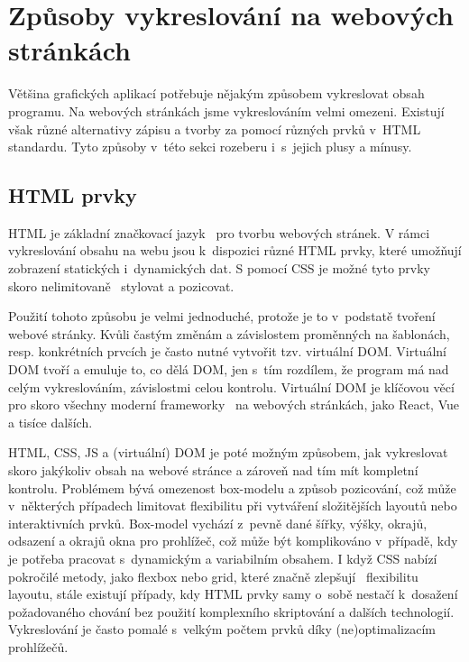 \section{Způsoby vykreslování na webových stránkách}\label{text:vykreslovani}

Většina grafických aplikací potřebuje nějakým způsobem vykreslovat obsah programu.
Na webových stránkách jsme vykreslováním velmi omezeni.
Existují však různé alternativy zápisu a tvorby za pomocí různých prvků v~HTML standardu.
Tyto způsoby v~této sekci rozeberu i~s~jejich plusy a mínusy.

\subsection{HTML prvky}\label{text:vykreslovani/html}

HTML je základní značkovací jazyk~\cite{uzayr2022frontend} pro tvorbu webových stránek. 
V rámci vykreslování obsahu na webu jsou k~dispozici různé HTML prvky, které umožňují zobrazení statických i~dynamických dat.
S pomocí CSS je možné tyto prvky skoro nelimitovaně~\cite{uzayr2022frontend} stylovat a pozicovat.

Použití tohoto způsobu je velmi jednoduché, protože je to v~podstatě tvoření webové stránky.
Kvůli častým změnám a závislostem proměnných na šablonách, resp. konkrétních prvcích je často nutné vytvořit tzv. virtuální DOM.
Virtuální DOM tvoří a emuluje to, co dělá DOM, jen s~tím rozdílem, že program má nad celým vykreslováním, závislostmi celou kontrolu.
Virtuální DOM je klíčovou věcí pro skoro všechny moderní frameworky~\cite{uzayr2022frontend} na webových stránkách, jako React, Vue a tisíce dalších.

HTML, CSS, JS a (virtuální) DOM je poté možným způsobem, jak vykreslovat skoro jakýkoliv obsah na webové stránce a zároveň nad tím mít kompletní kontrolu.
Problémem bývá omezenost box-modelu a způsob pozicování, což může v~některých případech limitovat flexibilitu při vytváření složitějších layoutů nebo interaktivních prvků. 
Box-model vychází z~pevně dané šířky, výšky, okrajů, odsazení a okrajů okna pro prohlížeč, což může být komplikováno v~případě, kdy je potřeba pracovat s~dynamickým a variabilním obsahem. 
I když CSS nabízí pokročilé metody, jako flexbox nebo grid, které značně zlepšují~\cite{uzayr2022frontend} flexibilitu layoutu, stále existují případy, kdy HTML prvky samy o~sobě nestačí k~dosažení požadovaného chování bez použití komplexního skriptování a dalších technologií.
Vykreslování je často pomalé s~velkým počtem prvků díky (ne)optimalizacím prohlížečů.

